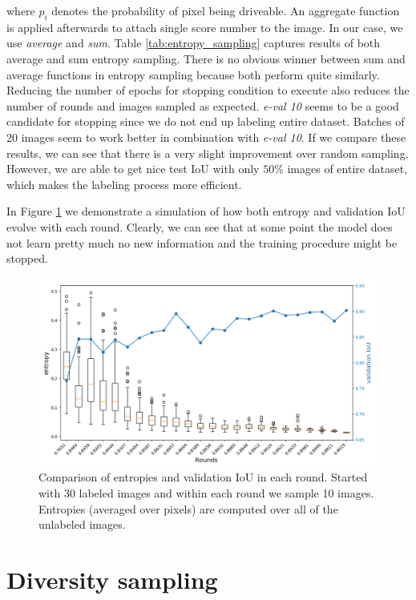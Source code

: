 where $p_i$ denotes the probability of pixel being driveable. An aggregate function is applied
afterwards to attach single score number to the image. In our case, we use \textit{average} and
\textit{sum}.
Table \ref{tab:entropy_sampling} captures results of both average and sum entropy sampling.
There is no obvious winner between sum and average functions in entropy sampling because
both perform quite similarly. Reducing
the number of epochs for stopping condition to execute also reduces the number of rounds and
images sampled as expected. \textit{e-val 10} seems to be a good candidate for stopping since we
do not end up labeling entire dataset. Batches of 20 images seem to work better in combination
with \textit{e-val 10}.
If we compare these results, we can see that there is a very slight improvement over random sampling.
However, we are able to get nice test IoU with only $50\%$ images of entire dataset, which
makes the labeling process more efficient.

In Figure \ref{img:boxplot_entropy} we demonstrate a simulation of how both entropy and 
validation IoU evolve with each round. Clearly, we can see that at some point the model
does not learn pretty much no new information and the training procedure might be stopped.

\begin{figure}[!h]
	\centerline{\includegraphics[width=1.05\textwidth]{images/boxplot_entropy.png}}
	\caption[Comparison of entropies and validation IoU]{Comparison of entropies and validation IoU
	in each round. Started with 30 labeled images and within each round we sample 10 images.
	Entropies (averaged over pixels) are computed over all of the unlabeled images.}
	\label{img:boxplot_entropy}
\end{figure}

\section{Diversity sampling}
\label{sec:diversity_sampling}

